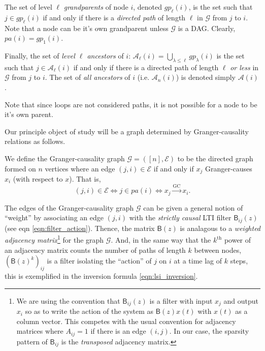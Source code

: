 \documentclass[12pt]{article}
\def\gc{\overset{\text{GC}}{\rightarrow}}  %
\def\gcg{\mathcal{G}}  %
\def\gcge{\mathcal{E}}  %
\def\B{\mathsf{B}}  %
\newcommand{\pa}[1]{pa(#1)}  %
\newcommand{\anc}[1]{\mathcal{A}(#1)}  %
\newcommand{\ancn}[2]{\mathcal{A}_{#1}(#2)}  %
\newcommand{\gpn}[2]{gp_{#1}(#2)}  %
\begin{document}
\begin{definition}
  The set of level $\ell$ \textit{grandparents} of node $i$, denoted
  $\gpn{\ell}{i}$, is the set such that $j \in \gpn{\ell}{i}$ if and
  only if there is a \textit{directed path} of length $\ell$ in $\gcg$
  from $j$ to $i$.  Note that a node can be it's own grandparent
  unless $\gcg$ is a DAG.  Clearly, $\pa{i} = \gpn{1}{i}$.

  Finally, the set of \textit{level $\ell$ ancestors} of $i$:
  $\ancn{\ell}{i} = \bigcup_{\lambda \le \ell}\gpn{\lambda}{i}$ is the
  set such that $j \in \ancn{\ell}{i}$ if and only if there is a
  directed path of length $\ell$ \textit{or less} in $\gcg$ from $j$
  to $i$.  The set of \textit{all ancestors} of $i$
  (i.e. $\ancn{n}{i}$) is denoted simply $\anc{i}$.

  Note that since loops are not considered paths, it is not possible
  for a node to be it's own parent.
\end{definition}

Our principle object of study will be a graph determined by
Granger-causality relations as follows.

\begin{definition}
  We define the Granger-causality graph $\gcg = ([n], \gcge)$ to be the directed
  graph formed on $n$ vertices where an edge $(j, i) \in \gcge$ if and
  only if $x_j$ Granger-causes $x_i$ (with respect to $x$).  That is,
  $$(j, i) \in \gcge \iff j \in \pa{i} \iff x_j \gc x_i.$$
\end{definition}

The edges of the Granger-causality graph $\gcg$ can be given a general
notion of ``weight'' by associating an edge $(j, i)$ with the
\textit{strictly causal} LTI filter $\B_{ij}(z)$ (see eqn
\eqref{eqn:filter_action}).  Thence, the matrix $\B(z)$ is analagous
to a \textit{weighted adjacency matrix}\footnote{We are using the
  convention that $\B_{ij}(z)$ is a filter with input $x_j$ and output
  $x_i$ so as to write the action of the system as $\B(z)x(t)$ with
  $x(t)$ as a column vector.  This competes with the usual convention
  for adjacency matrices where $A_{ij} = 1$ if there is an edge
  $(i, j)$.  In our case, the sparsity pattern of $\B_{ij}$ is the
  \textit{transposed} adjacency matrix.} for the graph $\gcg$.  And,
in the same way that the $k^{\text{th}}$ power of an adjacency matrix
counts the number of paths of length $k$ between nodes,
$(\B(z)^k)_{ij}$ is a filter isolating the ``action'' of $j$ on $i$ at
a time lag of $k$ steps, this is exemplified in the inversion formula
\ref{eqn:lsi_inversion}.
\end{document}
